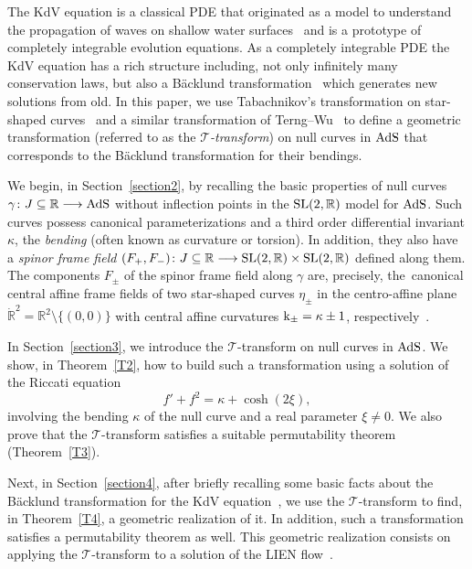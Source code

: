 \documentclass[pdftex]{sigma}
\numberwithin{equation}{section}
\def\bending{\kappa}
\def\R{\mathbb{R}}
\def\curvature{{\rm k}}
\def\SL{{\rm SL}(2,\R)}
\def\AdS{{\rm AdS}}
\begin{document}
The KdV equation is a classical PDE that originated as a model to understand the propagation of waves on shallow water surfaces~\cite{KV} and is a prototype of completely integrable evolution equations. As a completely integrable PDE the KdV equation has a rich structure including, not only infinitely many conservation laws, but also a B\"{a}cklund transformation~\cite{TU} which generates new solutions from old. In this paper, we use Tabachnikov's transformation on star-shaped curves~\cite{T} and a similar transformation of Terng--Wu~\cite{TW1} to define a geometric transformation (referred to as the \emph{$\mathcal{T}$-transform}) on null curves in $\AdS$ that corresponds to the B\"{a}cklund transformation for their bendings.

We begin, in Section~\ref{section2}, by recalling the basic properties of null curves $\gamma\colon J\subseteq\R\longrightarrow\AdS$ without inflection points in the $\SL$ model for $\AdS$. Such curves possess canonical parameterizations and a third order differential invariant $\bending$, the \emph{bending} (often known as curvature or torsion). In addition, they also have a \emph{spinor frame field} $(F_+,F_-)\colon J\subseteq\R\longrightarrow\SL\times\SL$ defined along them. The components $F_\pm$ of the spinor frame field along $\gamma$ are, precisely, the~canonical central affine frame fields of two star-shaped curves $\eta_\pm$ in the centro-affine plane $\dot{\R}^2=\R^2\setminus\{(0,0)\}$ with central affine curvatures $\curvature_\pm=\bending\pm 1$, respectively~\cite{MP}.

In Section~\ref{section3}, we introduce the $\mathcal{T}$-transform on null curves in $\AdS$. We show, in Theorem~\ref{T2}, how to build such a transformation using a solution of the Riccati equation
\begin{equation*}
	f'+f^2=\bending+\cosh(2\xi),
\end{equation*}
involving the bending $\bending$ of the null curve and a real parameter $\xi\neq 0$. We also prove that the $\mathcal{T}$-transform satisfies a suitable permutability theorem (Theorem~\ref{T3}).

Next, in Section~\ref{section4}, after briefly recalling some basic facts about the B\"{a}cklund transformation for the KdV equation~\cite{TU,TW2}, we use the $\mathcal{T}$-transform to find, in Theorem~\ref{T4}, a geometric realization of it. In addition, such a transformation satisfies a permutability theorem as well. This geometric realization consists on applying the $\mathcal{T}$-transform to a solution of the LIEN flow~\cite{MP}.
\end{document}
